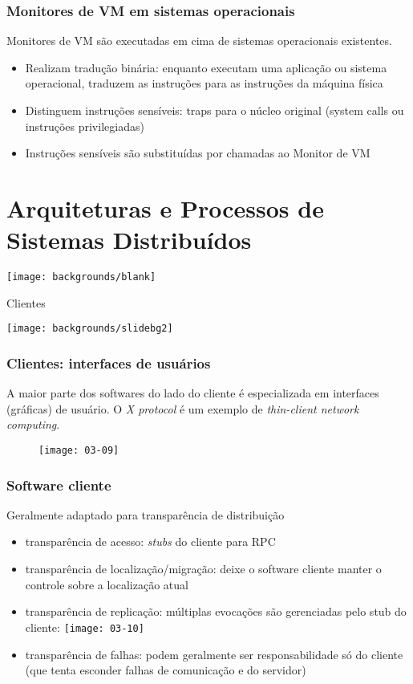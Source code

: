 \documentclass[Ligatures=TeX,table,brazil,svgnames,usetotalslideindicator,compress,10pt]{beamer}
\newcommand{\setintersectionbg}{
  \setbeamertemplate{background}
  {\texttt{[image: backgrounds/blank]}}
}
\newcommand{\setsectionbg}{
  \setbeamertemplate{background}
  {\texttt{[image: backgrounds/slidebg2]}}
}
\begin{document}
\begin{frame}
  \frametitle{Monitores de VM em sistemas operacionais}

  Monitores de VM são executadas em cima de sistemas operacionais existentes.

  \begin{itemize}
  \item Realizam \alert{tradução binária}: enquanto executam uma aplicação ou sistema operacional, traduzem as instruções para as instruções da máquina física
  \item Distinguem \alert{instruções sensíveis}: traps para o núcleo original (system calls ou instruções privilegiadas)
  \item Instruções sensíveis são substituídas por chamadas ao Monitor de VM
  \end{itemize}
\end{frame}



\section{Arquiteturas e Processos de Sistemas Distribuídos}


\setintersectionbg
\begin{frame}[standout]
  \huge{Clientes}
\end{frame}
\setsectionbg


\begin{frame}
  \frametitle{Clientes: interfaces de usuários}
  A maior parte dos softwares do lado do cliente é especializada em interfaces (gráficas) de usuário. O \textit{X protocol} é um exemplo de \textit{thin-client network computing}.

  \begin{figure}
    \texttt{[image: 03-09]}
  \end{figure}
\end{frame}

\begin{frame}
  \frametitle{Software cliente}
  \begin{block}{Geralmente adaptado para transparência de distribuição}
    \begin{itemize}
    \item \alert{transparência de acesso}: \textit{stubs} do cliente para RPC
    \item \alert{transparência de localização/migração}: deixe o software cliente manter o controle sobre a localização atual
    \item \alert{transparência de replicação}: múltiplas evocações são gerenciadas pelo stub do cliente:
      \texttt{[image: 03-10]}
    \item \alert{transparência de falhas}: podem geralmente ser responsabilidade só do cliente (que tenta esconder falhas de comunicação e do servidor)
    \end{itemize}
  \end{block}
\end{frame}
\end{document}
